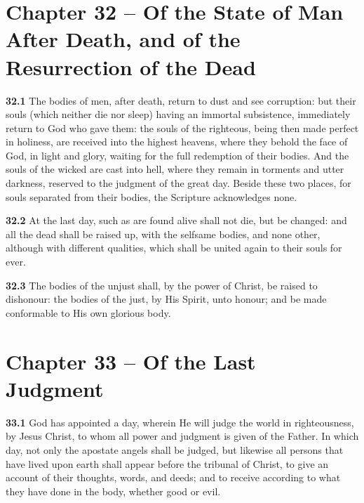\section{Chapter 32 -- Of the State of Man After Death, and of the Resurrection of the Dead}

\par\textbf{32.1} The bodies of men, after death, return to dust and see corruption: but their souls (which neither die nor sleep) having an immortal subsistence, immediately return to God who gave them: the souls of the righteous, being then made perfect in holiness, are received into the highest heavens, where they behold the face of God, in light and glory, waiting for the full redemption of their bodies. And the souls of the wicked are cast into hell, where they remain in torments and utter darkness, reserved to the judgment of the great day. Beside these two places, for souls separated from their bodies, the Scripture acknowledges none.   

\par\textbf{32.2} At the last day, such as are found alive shall not die, but be changed: and all the dead shall be raised up, with the selfsame bodies, and none other, although with different qualities, which shall be united again to their souls for ever.   

\par\textbf{32.3} The bodies of the unjust shall, by the power of Christ, be raised to dishonour: the bodies of the just, by His Spirit, unto honour; and be made conformable to His own glorious body.  

\section{Chapter 33 -- Of the Last Judgment}

\par\textbf{33.1} God has appointed a day, wherein He will judge the world in righteousness, by Jesus Christ, to whom all power and judgment is given of the Father. In which day, not only the apostate angels shall be judged, but likewise all persons that have lived upon earth shall appear before the tribunal of Christ, to give an account of their thoughts, words, and deeds; and to receive according to what they have done in the body, whether good or evil.   

